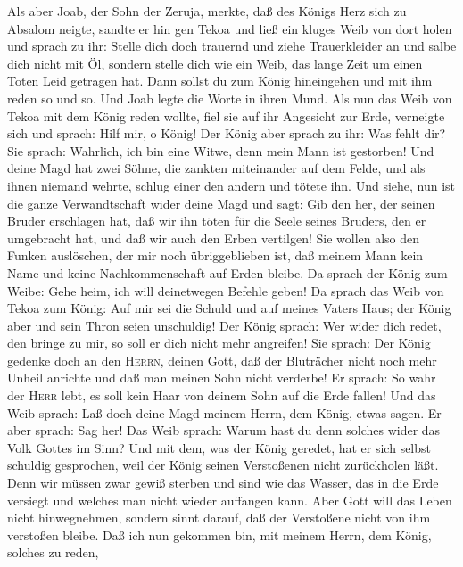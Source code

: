  Als aber Joab, der Sohn der Zeruja, merkte, daß des
Königs Herz sich zu Absalom neigte,  sandte er hin gen
Tekoa und ließ ein kluges Weib von dort holen und sprach zu ihr: Stelle
dich doch trauernd und ziehe Trauerkleider an und salbe dich nicht mit
Öl, sondern stelle dich wie ein Weib, das lange Zeit um einen Toten Leid
getragen hat.  Dann sollst du zum König hineingehen und
mit ihm reden so und so. Und Joab legte die Worte in ihren Mund.
 Als nun das Weib von Tekoa mit dem König reden wollte,
fiel sie auf ihr Angesicht zur Erde, verneigte sich und sprach: Hilf
mir, o König!  Der König aber sprach zu ihr: Was fehlt
dir? Sie sprach: Wahrlich, ich bin eine Witwe, denn mein Mann ist
gestorben!  Und deine Magd hat zwei Söhne, die zankten
miteinander auf dem Felde, und als ihnen niemand wehrte, schlug einer
den andern und tötete ihn.  Und siehe, nun ist die ganze
Verwandtschaft wider deine Magd und sagt: Gib den her, der seinen Bruder
erschlagen hat, daß wir ihn töten für die Seele seines Bruders, den er
umgebracht hat, und daß wir auch den Erben vertilgen! Sie wollen also
den Funken auslöschen, der mir noch übriggeblieben ist, daß meinem Mann
kein Name und keine Nachkommenschaft auf Erden bleibe.  Da
sprach der König zum Weibe: Gehe heim, ich will deinetwegen Befehle
geben!  Da sprach das Weib von Tekoa zum König: Auf mir
sei die Schuld und auf meines Vaters Haus; der König aber und sein Thron
seien unschuldig!  Der König sprach: Wer wider dich
redet, den bringe zu mir, so soll er dich nicht mehr angreifen!
 Sie sprach: Der König gedenke doch an den
\textsc{Herrn}, deinen Gott, daß der Bluträcher nicht noch mehr Unheil
anrichte und daß man meinen Sohn nicht verderbe! Er sprach: So wahr der
\textsc{Herr} lebt, es soll kein Haar von deinem Sohn auf die Erde
fallen!  Und das Weib sprach: Laß doch deine Magd meinem
Herrn, dem König, etwas sagen. Er aber sprach: Sag her! 
Das Weib sprach: Warum hast du denn solches wider das Volk Gottes im
Sinn? Und mit dem, was der König geredet, hat er sich selbst schuldig
gesprochen, weil der König seinen Verstoßenen nicht zurückholen läßt.
 Denn wir müssen zwar gewiß sterben und sind wie das
Wasser, das in die Erde versiegt und welches man nicht wieder auffangen
kann. Aber Gott will das Leben nicht hinwegnehmen, sondern sinnt darauf,
daß der Verstoßene nicht von ihm verstoßen bleibe.  Daß
ich nun gekommen bin, mit meinem Herrn, dem König, solches zu reden,

